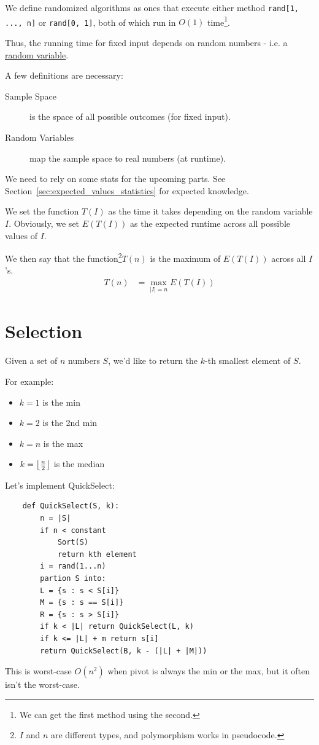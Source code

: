             We define randomized algorithms as ones that execute either method \verb|rand[1, ..., n]| or \verb|rand[0, 1]|, both of which run in $O(1)$ time\footnote{We can get the first method using the second.}.

            Thus, the running time for fixed input depends on random numbers - i.e.  a \uline{random variable}.

            A few definitions are necessary:
            \begin{description}
                \item[Sample Space] is the space of all possible outcomes (for fixed input).
                \item[Random Variables] map the sample space to real numbers (at runtime).
            \end{description}
            We need to rely on some stats for the upcoming parts.
            See Section~\ref{sec:expected_values_statistics} for expected knowledge.

            We set the function $T(I)$ as the time it takes depending on the random variable $I$.
            Obviously, we set $E(T(I))$ as the expected runtime across all possible values of $I$.

            We then say that the function\footnote{$I$ and $n$ are different types, and polymorphism works in pseudocode.}$T(n)$ is the maximum of $E(T(I))$ across all $I$'s.
            \begin{align*}
                T(n) &= \max_{|I| = n} E(T(I))
            \end{align*}
            \section{Selection} %
            \label{sec:selection}
                Given a set of $n$ numbers $S$, we'd like to return the $k$-th smallest element of $S$.

                For example:
                \begin{itemize}
                    \item $k = 1$ is the min
                    \item $k = 2$ is the 2nd min
                    \item $k = n$ is the max
                    \item $k = \left \lfloor \frac{n}{2} \right \rfloor$ is the median
                \end{itemize}
                Let's implement QuickSelect:
                \begin{verbatim}
    def QuickSelect(S, k):
        n = |S|
        if n < constant
            Sort(S)
            return kth element
        i = rand(1...n)
        partion S into:
        L = {s : s < S[i]}
        M = {s : s == S[i]}
        R = {s : s > S[i]}
        if k < |L| return QuickSelect(L, k)
        if k <= |L| + m return s[i]
        return QuickSelect(B, k - (|L| + |M|))
                \end{verbatim}
                This is worst-case $O(n^2)$ when pivot is always the min or the max, but it often isn't the worst-case.

